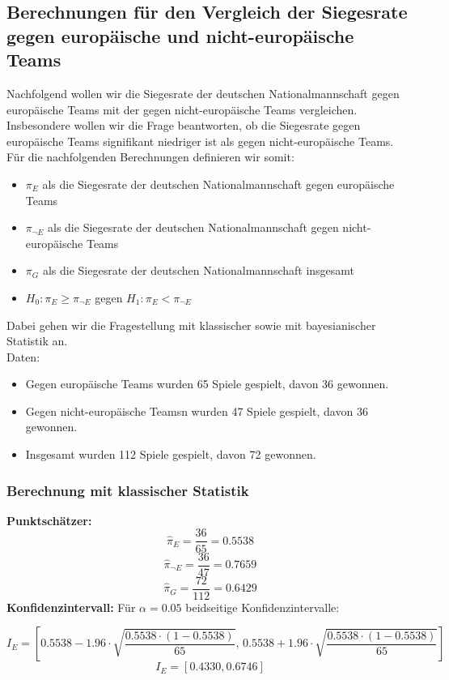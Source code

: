 \documentclass[a4paper,12pt]{article}
\begin{document}
\subsection{Berechnungen für den Vergleich der Siegesrate gegen europäische und nicht-europäische Teams}
\label{subsec:analyse}
Nachfolgend wollen wir die Siegesrate der deutschen Nationalmannschaft gegen europäische Teams mit der gegen nicht-europäische Teams vergleichen.
Insbesondere wollen wir die Frage beantworten, ob die Siegesrate gegen europäische Teams signifikant niedriger ist als gegen nicht-europäische Teams.
Für die nachfolgenden Berechnungen definieren wir somit:
\begin{itemize}
  \item \( \pi_E \) als die Siegesrate der deutschen Nationalmannschaft gegen europäische Teams
  \item \( \pi_{\neg E} \) als die Siegesrate der deutschen Nationalmannschaft gegen nicht-europäische Teams
  \item \( \pi_G \) als die Siegesrate der deutschen Nationalmannschaft insgesamt
  \item \( H_0 : \pi_E \geq \pi_{\neg E} \) gegen \( H_1 : \pi_E < \pi_{\neg E} \)
\end{itemize}
Dabei gehen wir die Fragestellung mit klassischer sowie mit bayesianischer Statistik an. \\

Daten:
\begin{itemize}
  \item Gegen europäische Teams wurden 65 Spiele gespielt, davon 36 gewonnen.
  \item Gegen nicht-europäische Teamsn wurden 47 Spiele gespielt, davon 36 gewonnen.
  \item Insgesamt wurden 112 Spiele gespielt, davon 72 gewonnen.
\end{itemize}

\subsubsection{Berechnung mit klassischer Statistik}

\textbf{Punktschätzer:}
\[
\hat{\pi}_E = \frac{36}{65} = 0.5538
\]
\[
\hat{\pi}_{\neg E} = \frac{36}{47} = 0.7659
\]
\[
\hat{\pi}_G = \frac{72}{112} = 0.6429
\]
\textbf{Konfidenzintervall:}
Für \(\alpha = 0.05\) beidseitige Konfidenzintervalle:

\[
I_E = \left[ 0.5538 - 1.96 \cdot \sqrt{\frac{0.5538 \cdot (1-0.5538)}{65}}, \, 0.5538 + 1.96 \cdot \sqrt{\frac{0.5538 \cdot (1-0.5538)}{65}} \right]
\]
\[
I_E = [0.4330, 0.6746]
\]
\end{document}
